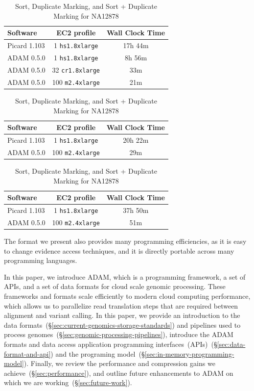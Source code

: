 \documentclass[10pt,twocolumn]{article}
\theoremstyle{plain}
\begin{document}
\begin{table}[h]
\label{table:overview}
\small
\caption{Sort, Duplicate Marking, and Sort + Duplicate Marking for NA12878}
\begin{center}
\begin{tabular}{| l | c | c |}
\hline
\bf Software & \bf EC2 profile & \bf Wall Clock Time \\
\hline
\hline
Picard 1.103 & 1 \texttt{hs1.8xlarge} & 17h 44m \\
ADAM 0.5.0 & 1 \texttt{hs1.8xlarge} & 8h 56m \\
ADAM 0.5.0 & 32 \texttt{cr1.8xlarge} & 33m \\
ADAM 0.5.0 & 100 \texttt{m2.4xlarge} & 21m \\ 
\hline
\end{tabular}
\begin{tabular}{| l | c | c |}
\hline
\bf Software & \bf EC2 profile & \bf Wall Clock Time \\
\hline
\hline
Picard 1.103 & 1 \texttt{hs1.8xlarge} & 20h 22m \\
ADAM 0.5.0 & 100 \texttt{m2.4xlarge} & 29m \\
\hline
\end{tabular}
\begin{tabular}{| l | c | c |}
\hline
\bf Software & \bf EC2 profile & \bf Wall Clock Time \\
\hline
\hline
Picard 1.103 & 1 \texttt{hs1.8xlarge} & 37h 50m \\
ADAM 0.5.0 & 100 \texttt{m2.4xlarge} & 51m \\
\hline
\end{tabular}
\end{center}
\end{table}

The format we present also provides many programming efficiencies, as it is easy to
change evidence access techniques, and it is directly portable across many programming languages.

In this paper, we introduce ADAM, which is a programming framework, a set of APIs, and a set of data formats for cloud scale genomic
processing. These frameworks and formats scale efficiently to modern cloud computing performance, which allows us to
parallelize read translation steps that are required between alignment and variant calling. In this paper, we provide an
introduction to the data formats~(\S\ref{sec:current-genomics-storage-standards}) and pipelines used to process
genomes~(\S\ref{sec:genomic-processing-pipelines}), introduce the ADAM formats and data access
application programming interfaces~(APIs)~(\S\ref{sec:data-format-and-api}) and the programing
model~(\S\ref{sec:in-memory-programming-model}). Finally, we review the performance and compression gains we
achieve~(\S\ref{sec:performance}), and outline future enhancements to ADAM on which we are working~(\S\ref{sec:future-work}).
\end{document}
